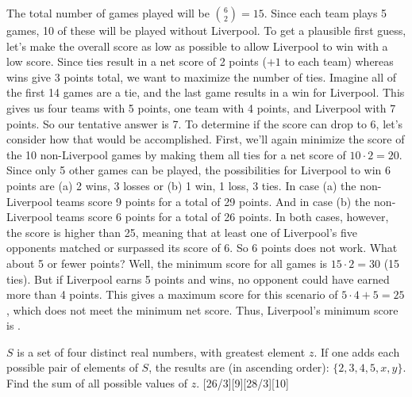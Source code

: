 \documentclass[12pt]{article}
\newcounter{problem}
\begin{document}
\begin{solution}[D]
   The total number of games played will be $\binom{6}{2}=15$. Since each team plays 5 games, 10 of these will be played without Liverpool. To get a plausible first guess, let's make the overall score as low as possible to allow Liverpool to win with a low score. Since ties result in a net score of 2 points ($+1$ to each team) whereas wins give 3 points total, we want to maximize the number of ties. \medbreak
        Imagine all of the first 14 games are a tie, and the last game results in a win for Liverpool. This gives us four teams with 5 points, one team with 4 points, and Liverpool with 7 points. So our tentative answer is 7. To determine if the score can drop to 6, let's consider how that would be accomplished. \medbreak
        First, we'll again minimize the score of the 10 non-Liverpool games by making them all ties for a net score of $10\cdot2=20$. Since only 5 other games can be played, the possibilities for Liverpool to win 6 points are (a) 2 wins, 3 losses or (b) 1 win, 1 loss, 3 ties. In case (a) the non-Liverpool teams score 9 points for a total of 29 points. And in case (b) the non-Liverpool teams score 6 points for a total of 26 points. In both cases, however, the score is higher than 25, meaning that at least one of Liverpool's five opponents matched or surpassed its score of 6. So 6 points does not work.\medbreak
        What about 5 or fewer points? Well, the minimum score for all games is $15\cdot2=30$ (15 ties). But if Liverpool earns 5 points and wins, no opponent could have earned more than 4 points. This gives a maximum score for this scenario of $5\cdot4+5=25$, which does not meet the minimum net score. Thus, Liverpool's minimum score is .
\end{solution}


\begin{problem}
   $S$ is a set of four distinct real numbers, with greatest element $z$. If one adds each possible pair of elements of $S$, the results are (in ascending order): $\{2, 3, 4, 5, x, y\}$. Find the sum of all possible values of $z$. 
   [26/3][9][28/3][10]
\end{problem}
\end{document}
